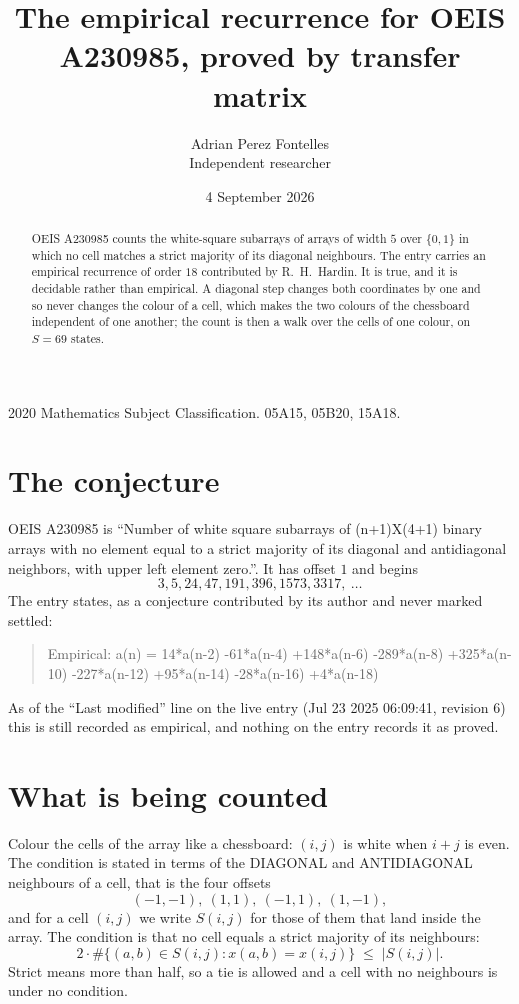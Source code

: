 \documentclass[11pt,a4paper]{article}
\title{The empirical recurrence for OEIS A230985, proved by transfer matrix}
\author{Adrian Perez Fontelles\\ \small Independent researcher}
\date{4 September 2026}
\theoremstyle{plain}
\theoremstyle{definition}
\begin{document}
\maketitle

\begin{abstract}
OEIS A230985 counts the white-square subarrays of arrays of width $5$ over $\{0,1\}$ in which
no cell matches a strict majority of its diagonal neighbours. The entry carries an empirical recurrence of order $18$ contributed by
R.~H.~Hardin. It is true, and it is decidable rather than empirical. A diagonal step changes
both coordinates by one and so never changes the colour of a cell, which makes the two colours
of the chessboard independent of one another; the count is then a walk over the cells of one
colour, on $S=69$ states.
\end{abstract}

\noindent\small 2020 Mathematics Subject Classification. 05A15, 05B20, 15A18.\normalsize

\section{The conjecture}

OEIS A230985 is ``Number of white square subarrays of (n+1)X(4+1) binary arrays with no element equal to a strict majority of its diagonal and antidiagonal neighbors, with upper left element zero.''. It has offset $1$ and begins
\[
3, 5, 24, 47, 191, 396, 1573, 3317,\ \dots
\]
The entry states, as a conjecture contributed by its author and never marked settled:
\begin{quote}
Empirical: a(n) = 14*a(n-2) -61*a(n-4) +148*a(n-6) -289*a(n-8) +325*a(n-10) -227*a(n-12) +95*a(n-14) -28*a(n-16) +4*a(n-18)
\end{quote}
As of the ``Last modified'' line on the live entry (Jul 23 2025 06:09:41, revision 6) this is still
recorded as empirical, and nothing on the entry records it as proved.

\section{What is being counted}

Colour the cells of the array like a chessboard: $(i,j)$ is white when $i+j$ is even. The
condition is stated in terms of the DIAGONAL and ANTIDIAGONAL neighbours of a cell, that is the
four offsets
\[
(-1,-1),\ (1,1),\ (-1,1),\ (1,-1),
\]
and for a cell $(i,j)$ we write $S(i,j)$ for those of them that land inside the array. The
condition is that no cell equals a strict majority of its neighbours:
\[
2\cdot\#\{(a,b)\in S(i,j) : x(a,b)=x(i,j)\}\;\le\;|S(i,j)| .
\]
Strict means more than half, so a tie is allowed and a cell with no neighbours is under no condition.
\end{document}
